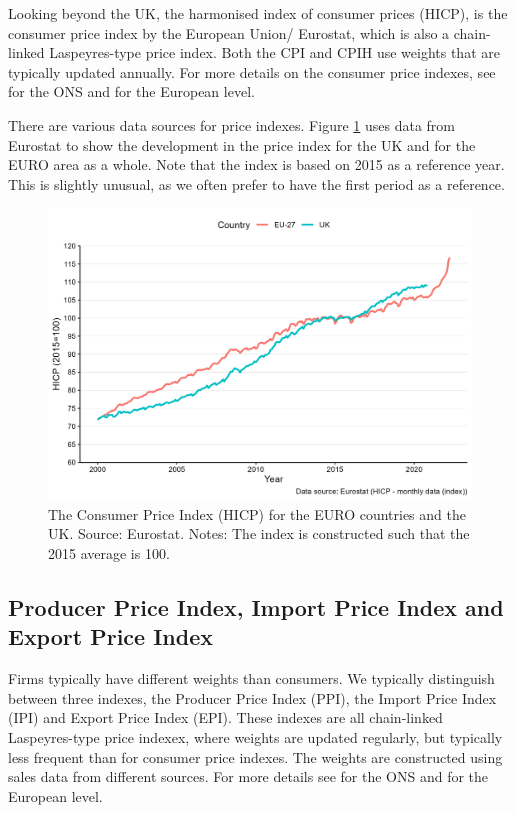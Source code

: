\documentclass[
]{book}
\begin{document}
Looking beyond the UK, the harmonised index of consumer prices (HICP), is the consumer price index by the European Union/ Eurostat, which is also a chain-linked Laspeyres-type price index. Both the CPI and CPIH use weights that are typically updated annually. For more details on the consumer price indexes, see \citep{cpions} for the ONS and \citep{cpieu} for the European level.

There are various data sources for price indexes. Figure \ref{fig:pricefig1} uses data from Eurostat to show the development in the price index for the UK and for the EURO area as a whole. Note that the index is based on 2015 as a reference year. This is slightly unusual, as we often prefer to have the first period as a reference.

\begin{figure}

{\centering \includegraphics[width=0.75\linewidth]{./resources/chapter_prices/ex1_1} 

}

\caption{The Consumer Price Index (HICP) for the EURO countries and the UK. Source: Eurostat. Notes: The index is constructed such that the 2015 average is 100.}\label{fig:pricefig1}
\end{figure}

\hypertarget{producer-price-index-import-price-index-and-export-price-index}{%
\subsection*{Producer Price Index, Import Price Index and Export Price Index}\label{producer-price-index-import-price-index-and-export-price-index}}

Firms typically have different weights than consumers. We typically distinguish between three indexes, the Producer Price Index (PPI), the Import Price Index (IPI) and Export Price Index (EPI). These indexes are all chain-linked Laspeyres-type price indexex, where weights are updated regularly, but typically less frequent than for consumer price indexes. The weights are constructed using sales data from different sources. For more details see \citep{ppions} for the ONS and \citep{ppieu} for the European level.
\end{document}

